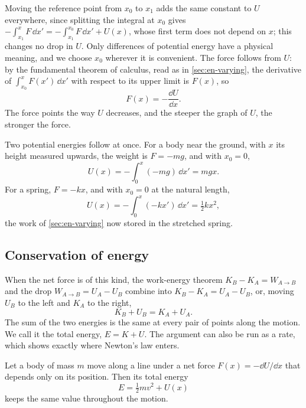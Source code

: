 Moving the reference point from $x_0$ to $x_1$ adds the same constant to
$U$ everywhere, since splitting the integral at $x_0$ gives
$-\int_{x_1}^{x} F\,\dd x' = -\int_{x_1}^{x_0} F\,\dd x' + U(x)$, whose
first term does not depend on $x$; this changes no drop in $U$. Only differences of potential
energy have a physical meaning, and we choose $x_0$ wherever it is
convenient. The force follows from $U$: by the fundamental theorem of
calculus, read as in \cref{sec:en-varying}, the derivative of
$\int_{x_0}^{x}F(x')\,\dd x'$ with respect to its upper limit is $F(x)$,
so
\begin{equation}
   F(x) = -\frac{\dd U}{\dd x} .
   \label{eq:en-force-1d}
\end{equation}
The force points the way $U$ decreases, and the steeper the graph of $U$,
the stronger the force.

Two potential energies follow at once. For a body near the ground, with
$x$ its height measured upwards, the weight is $F = -mg$, and with $x_0 =
0$,
\begin{equation*}
   U(x) = -\int_0^x(-mg)\,\dd x' = mgx .
\end{equation*}
For a spring, $F = -kx$, and with $x_0 = 0$ at the natural length,
\begin{equation*}
   U(x) = -\int_0^x(-kx')\,\dd x' = \tfrac12 k x^2 ,
\end{equation*}
the work of \cref{sec:en-varying} now stored in the stretched spring.

\subsection*{Conservation of energy}

When the net force is of this kind, the work-energy theorem $K_B - K_A = W_{A\to
B}$ and the drop $W_{A\to B} = U_A - U_B$ combine into $K_B - K_A = U_A -
U_B$, or, moving $U_B$ to the left and $K_A$ to the right,
\begin{equation*}
   K_B + U_B = K_A + U_A .
\end{equation*}
The sum of the two energies is the same at every pair of points along the
motion. We call it the total energy, $E = K + U$. The argument can also
be run as a rate, which shows exactly where Newton's law enters.

\begin{proposition}
\label{prop:en-energy-1d}
Let a body of mass $m$ move along a line under a net force $F(x) = -\dd
U/\dd x$ that depends only on its position. Then its total energy
\begin{equation*}
   E = \tfrac12 m v^2 + U(x)
\end{equation*}
keeps the same value throughout the motion.
\end{proposition}

